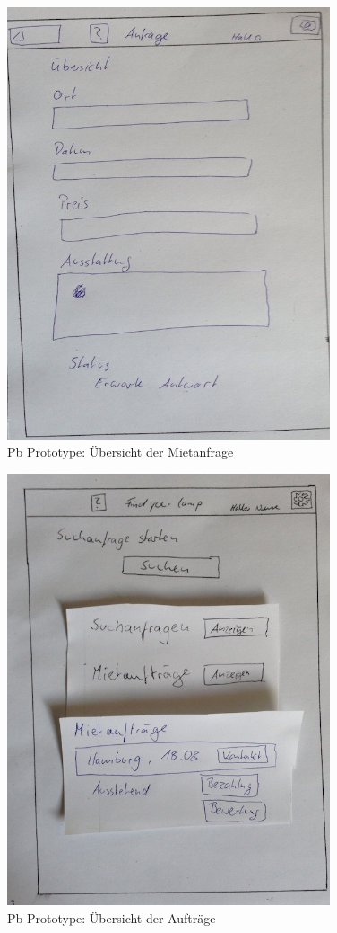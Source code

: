 \begin{figure}[H]
\centering
\includegraphics[angle=90, width=0.85\textwidth]{./images/paperbased/anfrageuebersicht.JPG}
\caption{Pb Prototype: Übersicht der Mietanfrage}
\label{pbprototype3}
\end{figure}

\begin{figure}[H]
\centering
\includegraphics[angle=90, width=0.85\textwidth]{./images/paperbased/auftraege.JPG}
\caption{Pb Prototype: Übersicht der Aufträge}
\label{pbprototype4}
\end{figure}

